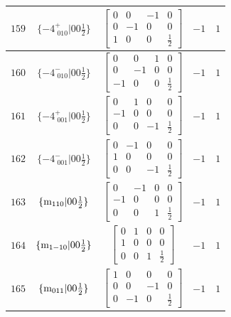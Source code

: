 \documentclass[fleqn,8pt]{jsarticle}
\begin{document}
\begin{longtable}{ccccc}
$ 159 $ & $ \{-4^{+}_{\,\,010}|0 0 \frac{1}{2}\} $ & $ \begin{bmatrix} 0 & 0 & -1 & 0 \\ 0 & -1 & 0 & 0 \\ 1 & 0 & 0 & \frac{1}{2} \end{bmatrix} $ & $ -1 $ & $ 1 $ \\ \hline
$ 160 $ & $ \{-4^{-}_{\,\,010}|0 0 \frac{1}{2}\} $ & $ \begin{bmatrix} 0 & 0 & 1 & 0 \\ 0 & -1 & 0 & 0 \\ -1 & 0 & 0 & \frac{1}{2} \end{bmatrix} $ & $ -1 $ & $ 1 $ \\ \hline
$ 161 $ & $ \{-4^{+}_{\,\,001}|0 0 \frac{1}{2}\} $ & $ \begin{bmatrix} 0 & 1 & 0 & 0 \\ -1 & 0 & 0 & 0 \\ 0 & 0 & -1 & \frac{1}{2} \end{bmatrix} $ & $ -1 $ & $ 1 $ \\ \hline
$ 162 $ & $ \{-4^{-}_{\,\,001}|0 0 \frac{1}{2}\} $ & $ \begin{bmatrix} 0 & -1 & 0 & 0 \\ 1 & 0 & 0 & 0 \\ 0 & 0 & -1 & \frac{1}{2} \end{bmatrix} $ & $ -1 $ & $ 1 $ \\ \hline
$ 163 $ & $ \{{\rm m}_{110}|0 0 \frac{1}{2}\} $ & $ \begin{bmatrix} 0 & -1 & 0 & 0 \\ -1 & 0 & 0 & 0 \\ 0 & 0 & 1 & \frac{1}{2} \end{bmatrix} $ & $ -1 $ & $ 1 $ \\ \hline
$ 164 $ & $ \{{\rm m}_{1-10}|0 0 \frac{1}{2}\} $ & $ \begin{bmatrix} 0 & 1 & 0 & 0 \\ 1 & 0 & 0 & 0 \\ 0 & 0 & 1 & \frac{1}{2} \end{bmatrix} $ & $ -1 $ & $ 1 $ \\ \hline
$ 165 $ & $ \{{\rm m}_{011}|0 0 \frac{1}{2}\} $ & $ \begin{bmatrix} 1 & 0 & 0 & 0 \\ 0 & 0 & -1 & 0 \\ 0 & -1 & 0 & \frac{1}{2} \end{bmatrix} $ & $ -1 $ & $ 1 $ \\ \hline

\end{longtable}
\end{document}

